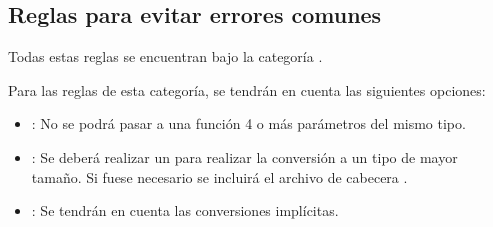 \subsection{Reglas para evitar errores comunes}

Todas estas reglas se encuentran bajo la categoría .

Para las reglas de esta categoría, se tendrán en cuenta las siguientes
opciones:

\begin{itemize}

\item {}: No se podrá pasar a una
función 4 o más parámetros del mismo tipo.

\item {}: Se deberá
realizar un  para realizar la conversión a un tipo
de mayor tamaño. Si fuese necesario se incluirá el archivo de cabecera 
.

\item {}: Se tendrán en cuenta las
conversiones implícitas.

\end{itemize}
